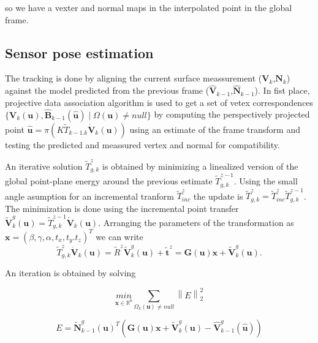 so we have a vexter and normal maps in the interpolated point in the global frame.

\subsection{Sensor pose estimation}

The tracking is done by aligning the current surface meassurement ($\mathbf{V}_k$,$\mathbf{N}_k$) against the model predicted from the previous frame ($\hat{\mathbf{V}}_{k-1}$,$\hat{\mathbf{N}}_{k-1}$).
In fist place, projective data association algorithm is used to get a set of vetex correspondences $\{ \mathbf{V}_k(\mathbf{u}), \hat{\mathbf{B}}_{k-1}(\hat{\mathbf{u}}) \mid \Omega(\mathbf{u}) \neq null \}$ by computing the perspectively projected point $\hat{\mathbf{u}} = \pi(K \tilde{T}_{k-1.k} \dot{\mathbf{V}}_k(\mathbf{u}))$ using an estimate of the frame transform and testing the predicted and meassured vertex and normal for compatibility.

An iterative solution $\tilde{T}^z_{g,k}$ is obtained by minimizing a linealized version of the global point-plane energy around the previous estimate $\tilde{T}^{z-1}_{g,k}$. Using the small angle asumption for an incremental tranform $\tilde{T}^z_{inc}$ the update is $\tilde{T}^z_{g,k} = \tilde{T}^z_{inc}\tilde{T}^{z-1}_{g,k}$.
The minimization is done using the incremental point transfer $\tilde{\mathbf{V}}^g_k(\mathbf{u}) = \tilde{T}^{z-1}_{g,k} \dot{\mathbf{V}}_k(\mathbf{u})$. 
Arranging the parameters of the transformation as $ \mathbf{x} = (\beta,\gamma,\alpha,t_x,t_y.t_z)^T$ we can write
\begin{equation}
\tilde{T}^z_{g,k} \dot{\mathbf{V}}_k(\mathbf{u}) = \tilde{R}^z \tilde{\mathbf{V}}^g_k(\mathbf{u}) + \tilde{\mathbf{t}}^z = \mathbf{G}(\mathbf{u})\mathbf{x} + \tilde{\mathbf{V}}^g_k(\mathbf{u}).
\end{equation}

An iteration is obtained by solving

\begin{equation}
\underset{\mathbf{x} \in  \mathbb{R}^6 }{min} \sum_{\Omega_k (\mathbf{u}) \neq null} \left \| E \right \|^2_2
\end{equation}

\begin{equation}
 E = \tilde{\mathbf{N}}^g_{k-1}(\mathbf{u})^T \left( \mathbf{G}(\mathbf{u})\mathbf{x} + \tilde{\mathbf{V}}^g_k(\mathbf{u}) - \hat{\mathbf{V}}^g_{k-1}(\hat{\mathbf{u}}) \right)
\end{equation}

